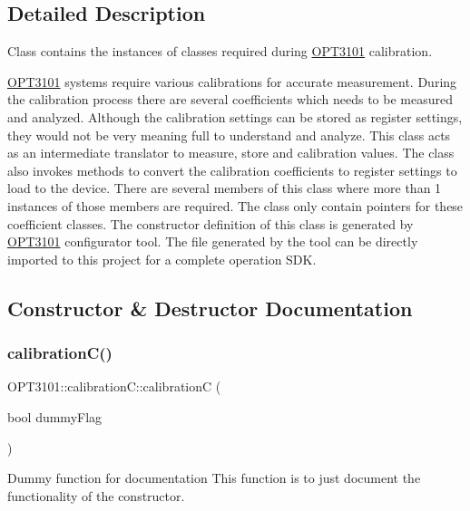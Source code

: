 \subsection{Detailed Description}
Class contains the instances of classes required during \mbox{\hyperlink{namespace_o_p_t3101}{O\+P\+T3101}} calibration. 

\mbox{\hyperlink{namespace_o_p_t3101}{O\+P\+T3101}} systems require various calibrations for accurate measurement. During the calibration process there are several coefficients which needs to be measured and analyzed. Although the calibration settings can be stored as register settings, they would not be very meaning full to understand and analyze. This class acts as an intermediate translator to measure, store and calibration values. The class also invokes methods to convert the calibration coefficients to register settings to load to the device. There are several members of this class where more than 1 instances of those members are required. The class only contain pointers for these coefficient classes. The constructor definition of this class is generated by \mbox{\hyperlink{namespace_o_p_t3101}{O\+P\+T3101}} configurator tool. The file generated by the tool can be directly imported to this project for a complete operation S\+DK. 

\subsection{Constructor \& Destructor Documentation}
\mbox{\label{class_o_p_t3101_1_1calibration_c_a84e3f1b924cf7f677977e36663ddad7a}} 
\subsubsection{\texorpdfstring{calibration\+C()}{calibrationC()}\hspace{0.1cm}{\footnotesize\ttfamily [1/2]}}
{\footnotesize\ttfamily O\+P\+T3101\+::calibration\+C\+::calibrationC (\begin{DoxyParamCaption}\item[{bool}]{dummy\+Flag }\end{DoxyParamCaption})}



Dummy function for documentation This function is to just document the functionality of the constructor. 

